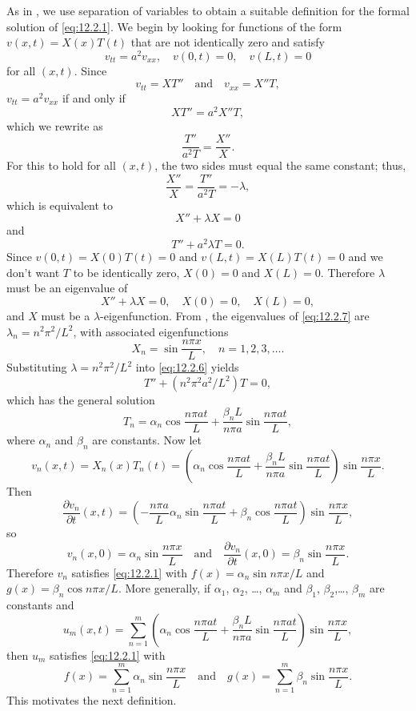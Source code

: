
As in , we use separation of
variables to obtain a suitable
definition for the formal solution of \eqref{eq:12.2.1}.
 We begin by looking for functions of the form
$v(x,t)=X(x)T(t)$
that are not identically zero and satisfy
\[
v_{tt}=a^2v_{xx},\quad
v(0,t)=0,\quad v(L,t)=0
\]
for all $(x,t)$.
Since
\[
v_{tt}=XT''\quad\text{and}\quad v_{xx}=X''T,
\]
$v_{tt}=a^2v_{xx}$ if and only if
\[
XT''=a^2X''T,
\]
which we rewrite as
\[
\frac{T''}{a^2T}=\frac{X''}{X}.
\]
For this  to hold for all $(x,t)$,
 the two sides must equal the same constant;
thus,
\[
\frac{X''}{X}=\frac{T''}{a^2T}=-\lambda,
\]
which is equivalent to
\[
X''+\lambda X=0
\]
and
\begin{equation} \label{eq:12.2.6}
T''+a^2\lambda T=0.
\end{equation}
Since $v(0,t)=X(0)T(t)=0$ and $v(L,t)=X(L)T(t)=0$ and we don't want
$T$ to be  identically
zero,  $X(0)=0$ and $X(L)=0$. Therefore $\lambda$
must be an eigenvalue of
\begin{equation} \label{eq:12.2.7}
X''+\lambda X=0,\quad X(0)=0,\quad X(L)=0,
\end{equation}
and $X$ must be a $\lambda$-eigenfunction.
 From , the eigenvalues of \eqref{eq:12.2.7}
are $\lambda_n=n^2\pi^2/L^2$, with
associated eigenfunctions
\[
X_n=\sin\frac{n\pi x}{L}, \quad n=1,2,3,\dots.
\]
Substituting $\lambda=n^2\pi^2/L^2$  into
\eqref{eq:12.2.6} yields
\[
T''+(n^2\pi^2a^2/L^2)T=0,
\]
which has the general solution
\[
T_n=\alpha_n\cos\frac{n\pi at}{L}+\frac{\beta_nL}{n\pi a}\sin\frac{n\pi
at}{L},
\]
where $\alpha_n$  and $\beta_n$ are constants. Now let
\[
v_n(x,t)=X_n(x)T_n(t)=\left(\alpha_n\cos\frac{n\pi at}{L}+
\frac{\beta_nL}{n\pi a}\sin\frac{n\pi at}{L}\right)
\sin\frac{n\pi x}{L}.
\]
Then
\[
\frac{\partial v_n}{\partial t}(x,t)=
\left(-\frac{n\pi a }{L}\alpha_n\sin\frac{n\pi at}{L}
+\beta_n\cos\frac{n\pi at}{L}\right)\sin\frac{n\pi x}{L},
\]
so
\[
v_n(x,0)=\alpha_n\sin\frac{n\pi x}{L}
\quad\text{and}\quad
\frac{\partial v_n}{\partial t}(x,0)=\beta_n
\sin\frac{n\pi x}{L}.
\]
Therefore $v_n$ satisfies \eqref{eq:12.2.1} with
$f(x)=\alpha_n \sin n\pi x/L$ and  $g(x)=\beta_n\cos n\pi x/L$.
More generally, if $\alpha_1$,  $\alpha_2$, \dots, $\alpha_m$
and $\beta_1$, $\beta_2$,\dots, $\beta_m$ are constants and
\[
u_m(x,t)=\sum_{n=1}^m\left(\alpha_n\cos\frac{n\pi at}{L}+\frac{\beta_nL}{n\pi a}\sin\frac{n\pi at}{L}\right)
\sin\frac{n\pi x}{L},
\]
then $u_m$ satisfies \eqref{eq:12.2.1} with
\[
f(x)=\sum_{n=1}^m \alpha_n\sin\frac{n\pi x}{L}
\quad\text{and}\quad
g(x)=\sum_{n=1}^m \beta_n\sin\frac{n\pi x}{L}.
\]
 This motivates the next definition.

